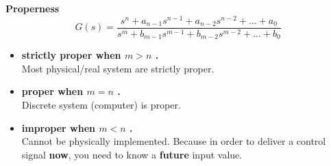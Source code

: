  

\textbf{\large Properness}
\begin{equation*}
    G(s) = \frac{s^n + a_{n-1}s^{n-1}+a_{n-2}s^{n-2}+\ldots + a_0}{s^m + b_{m-1}s^{m-1}+b_{m-2}s^{m-2}+\ldots + b_0}
\end{equation*}
\begin{itemize}
    \item \textbf{strictly proper when $m > n$ .} \\ Most physical/real system are strictly proper.
    \item \textbf{proper when $m = n$ .} \\ Discrete system (computer) is proper.
    \item \textbf{improper when $m < n$ .} \\ Cannot be physically implemented. Because in order to deliver a control signal \textbf{now}, you need to know a \textbf{future} input value.
\end{itemize}

